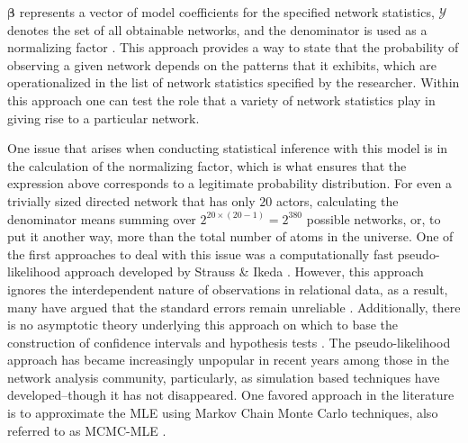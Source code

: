 \documentclass[9pt,twocolumn,twoside,lineno]{pnas-new}
\begin{document}
$\bm\beta$ represents a vector of model coefficients for the specified network statistics, $\mathcal{Y}$ denotes the set of all obtainable networks, and the denominator is used as a normalizing factor \citep{hunter:etal:2008}. This approach provides a way to state that the probability of observing a given network depends on the patterns that it exhibits, which are operationalized in the list of network statistics specified by the researcher. Within this approach one can test the role that a variety of network statistics play in giving rise to a particular network.

One issue that arises when conducting statistical inference with this model is in the calculation of the normalizing factor, which is what ensures that the expression above corresponds to a legitimate probability distribution. For even a trivially sized directed network that has only $20$ actors, calculating the denominator means summing over $2^{20\times(20-1)} = 2^{380}$ possible networks, or, to put it another way, more than the total number of atoms in the universe. One of the first approaches to deal with this issue was a computationally fast pseudo-likelihood approach developed by Strauss \& Ikeda \citep{strauss:ikeda:1990}. However, this approach ignores the interdependent nature of observations in relational data, as a result, many have argued that the standard errors remain unreliable \citep{vanduijn:etal:2009}. Additionally, there is no asymptotic theory underlying this approach on which to base the construction of confidence intervals and hypothesis tests \citep{kolaczyk:2009}. The pseudo-likelihood approach has became increasingly unpopular in recent years among those in the network analysis community, particularly, as simulation based techniques have developed--though it has not disappeared. One favored approach in the literature is to approximate the MLE using Markov Chain Monte Carlo techniques, also referred to as MCMC-MLE \citep{geyer:thompson:1992,snijders:2002,handcock:2003a}.
\end{document}
